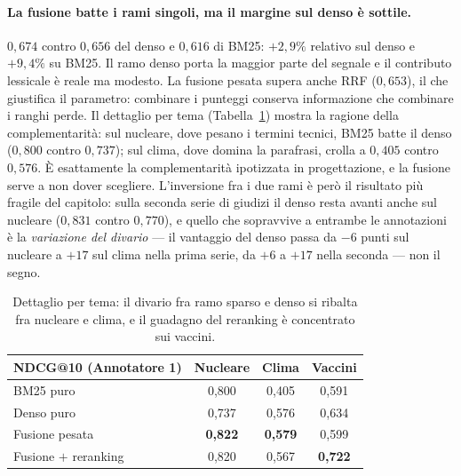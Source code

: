 \documentclass[11pt,a4paper]{report}
\begin{document}
\paragraph{La fusione batte i rami singoli, ma il margine sul denso è sottile.} $0{,}674$ contro
$0{,}656$ del denso e $0{,}616$ di BM25: $+2{,}9\%$ relativo sul denso e $+9{,}4\%$ su BM25. Il
ramo denso porta la maggior parte del segnale e il contributo lessicale è reale ma modesto. La
fusione pesata supera anche RRF ($0{,}653$), il che giustifica il parametro: combinare i punteggi
conserva informazione che combinare i ranghi perde. Il dettaglio per tema
(Tabella~\ref{tab:ablazione-topic}) mostra la ragione della complementarità: sul nucleare, dove
pesano i termini tecnici, BM25 batte il denso ($0{,}800$ contro $0{,}737$); sul clima, dove domina la
parafrasi, crolla a $0{,}405$ contro $0{,}576$. È esattamente la complementarità ipotizzata in
progettazione, e la fusione serve a non dover scegliere. L'inversione fra i due rami è però il
risultato più fragile del capitolo: sulla seconda serie di giudizi il denso resta avanti anche sul
nucleare ($0{,}831$ contro $0{,}770$), e quello che sopravvive a entrambe le annotazioni è la
\emph{variazione del divario} --- il vantaggio del denso passa da $-6$ punti sul nucleare a
$+17$ sul clima nella prima serie, da $+6$ a $+17$ nella seconda --- non il segno.

\begin{table}[t]
\centering
\small
\begin{tabular}{lccc}
\toprule
\textbf{NDCG@10 (Annotatore 1)} & \textbf{Nucleare} & \textbf{Clima} & \textbf{Vaccini} \\
\midrule
BM25 puro & 0,800 & 0,405 & 0,591 \\
Denso puro & 0,737 & 0,576 & 0,634 \\
Fusione pesata & \textbf{0,822} & \textbf{0,579} & 0,599 \\
Fusione $+$ reranking & 0,820 & 0,567 & \textbf{0,722} \\
\bottomrule
\end{tabular}
\caption{Dettaglio per tema: il divario fra ramo sparso e denso si ribalta fra nucleare e clima, e
il guadagno del reranking è concentrato sui vaccini.}
\label{tab:ablazione-topic}
\end{table}
\end{document}
